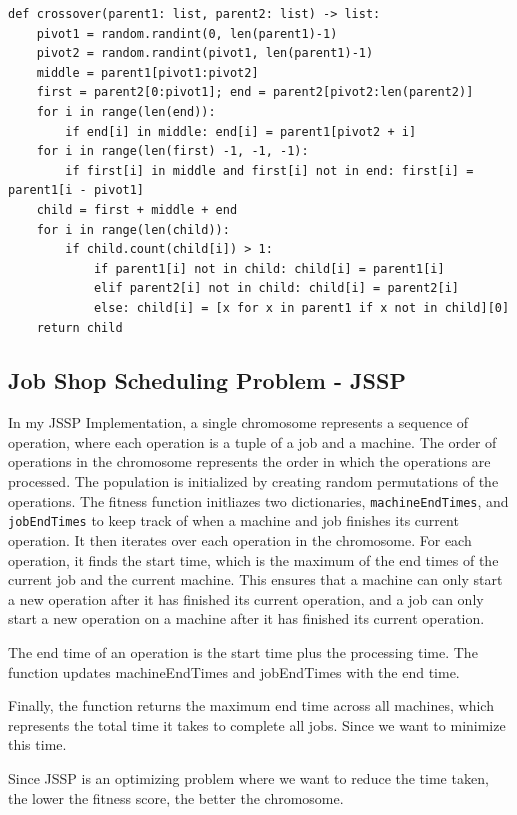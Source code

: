 \documentclass{article}
\theoremstyle{mytheoremstyle}
\theoremstyle{mytheoremstyle}
\theoremstyle{myproblemstyle}
\begin{document}
\begin{lstlisting}[label=tsp_crossover, caption={Crossover Algorithm}]
def crossover(parent1: list, parent2: list) -> list:
    pivot1 = random.randint(0, len(parent1)-1)
    pivot2 = random.randint(pivot1, len(parent1)-1)
    middle = parent1[pivot1:pivot2]
    first = parent2[0:pivot1]; end = parent2[pivot2:len(parent2)]
    for i in range(len(end)):
        if end[i] in middle: end[i] = parent1[pivot2 + i]
    for i in range(len(first) -1, -1, -1):
        if first[i] in middle and first[i] not in end: first[i] = parent1[i - pivot1]
    child = first + middle + end
    for i in range(len(child)):
        if child.count(child[i]) > 1:
            if parent1[i] not in child: child[i] = parent1[i]
            elif parent2[i] not in child: child[i] = parent2[i]
            else: child[i] = [x for x in parent1 if x not in child][0]
    return child
\end{lstlisting}

\subsection{Job Shop Scheduling Problem - JSSP}
In my JSSP Implementation, a single chromosome represents a sequence of operation, where each operation is a tuple of a job and a machine. The order of operations in the chromosome represents the order in which the operations are processed. The population is initialized by creating random permutations of the operations. The fitness function initliazes two dictionaries, \texttt{machineEndTimes}, and \texttt{jobEndTimes} to keep track of when a machine and job finishes its current operation. It then iterates over each operation in the chromosome. For each operation, it finds the start time, which is the maximum of the end times of the current job and the current machine. This ensures that a machine can only start a new operation after it has finished its current operation, and a job can only start a new operation on a machine after it has finished its current operation.

The end time of an operation is the start time plus the processing time. The function updates machineEndTimes and jobEndTimes with the end time.

Finally, the function returns the maximum end time across all machines, which represents the total time it takes to complete all jobs. Since we want to minimize this time.

Since JSSP is an optimizing problem where we want to reduce the time taken, the lower the fitness score, the better the chromosome.
\end{document}
